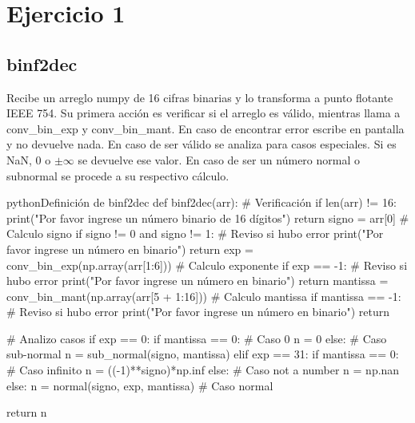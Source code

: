 \section{Ejercicio 1}

	\subsection{binf2dec}
		Recibe un arreglo numpy de 16 cifras binarias y lo transforma a punto flotante IEEE 754. Su primera acción es verificar si el arreglo es válido, mientras llama a conv\_bin\_exp y conv\_bin\_mant. En caso de encontrar error escribe en pantalla y no devuelve nada. En caso de ser válido se analiza para casos especiales. Si es NaN, 0 o $\pm\infty$ se devuelve ese valor. En caso de ser un número normal o subnormal se procede a su respectivo cálculo.
		
		\begin{sourcecode}[\label{codigo-python-1}]{python}{Definición de binf2dec}
def binf2dec(arr):
    # Verificación
    if len(arr) != 16:
        print("Por favor ingrese un número binario de 16 dígitos")
        return
    signo = arr[0]											# Calculo signo
    if signo != 0 and signo != 1:							# Reviso si hubo error
        print("Por favor ingrese un número en binario")
        return
    exp = conv_bin_exp(np.array(arr[1:6]))                  # Calculo exponente
    if exp == -1:                                           # Reviso si hubo error
        print("Por favor ingrese un número en binario")
        return
    mantissa = conv_bin_mant(np.array(arr[5 + 1:16]))       # Calculo mantissa
    if mantissa == -1:                                      # Reviso si hubo error
        print("Por favor ingrese un número en binario")
        return

    # Analizo casos
    if exp == 0:
        if mantissa == 0:                                   # Caso 0
            n = 0
        else:                                               # Caso sub-normal
            n = sub_normal(signo, mantissa)
    elif exp == 31:
        if mantissa == 0:                                   # Caso infinito
            n = ((-1)**signo)*np.inf
        else:                                               # Caso not a number
            n = np.nan
    else:
        n = normal(signo, exp, mantissa)                    # Caso normal

    return n
\end{sourcecode}




